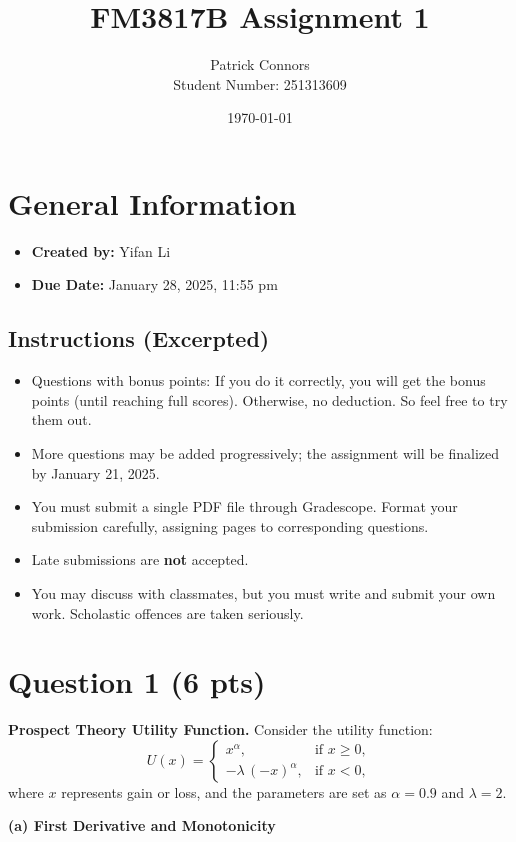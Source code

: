 \documentclass[12pt]{article}
\title{FM3817B Assignment 1}
\author{Patrick Connors \\ Student Number: 251313609}
\date{\today}
\begin{document}
\maketitle

\section*{General Information}
\begin{itemize}
    \item \textbf{Created by:} Yifan Li
    \item \textbf{Due Date:} January 28, 2025, 11:55 pm
\end{itemize}

\subsection*{Instructions (Excerpted)}
\begin{itemize}
    \item Questions with bonus points: If you do it correctly, you will get the bonus points (until reaching full scores). Otherwise, no deduction. So feel free to try them out.
    \item More questions may be added progressively; the assignment will be finalized by January 21, 2025.
    \item You must submit a single PDF file through Gradescope. Format your submission carefully, assigning pages to corresponding questions.
    \item Late submissions are \textbf{not} accepted.
    \item You may discuss with classmates, but you must write and submit your own work. Scholastic offences are taken seriously.
\end{itemize}

\section*{Question 1 (6 pts)}
\textbf{Prospect Theory Utility Function.} Consider the utility function:
\[
U(x) = 
\begin{cases} 
x^\alpha, & \text{if } x \ge 0,\\
-\lambda \,(-x)^\alpha, & \text{if } x < 0,
\end{cases}
\]
where \(x\) represents gain or loss, and the parameters are set as \(\alpha = 0.9\) and \(\lambda = 2\).

\noindent \textbf{(a) First Derivative and Monotonicity}
\end{document}
